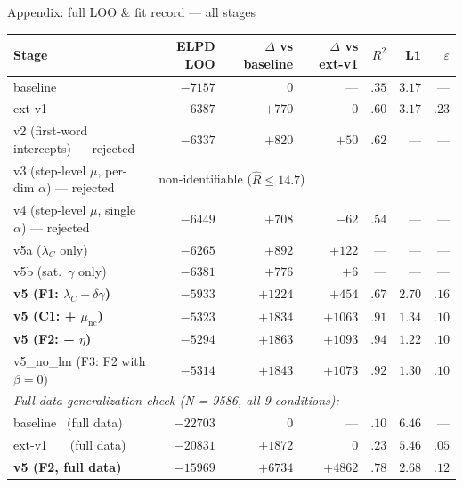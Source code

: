 \documentclass[10pt,aspectratio=169]{beamer}
\newcommand{\main}[1]{\textcolor{CSP-main-dark}{\textbf{#1}}}
\newcommand{\emp}[1]{\textcolor{CSP-emphasis}{\textbf{#1}}}
\newcommand{\acct}[1]{\textcolor{CSP-accent-1-dark}{#1}}      %
\newcommand{\muted}[1]{\textcolor{CSP-text-light}{#1}}
\begin{document}
\begin{frame}{Appendix: full LOO \& fit record --- all stages}
\footnotesize
\begin{center}
\begin{tabular}{l rrrr rr}
\toprule
Stage & ELPD LOO & $\Delta$ vs baseline & $\Delta$ vs ext-v1 & $R^2$ & L1 & $\varepsilon$ \\
\midrule
baseline        & $-7157$ & $0$       & ---       & $.35$ & $3.17$ & ---   \\
ext-v1          & $-6387$ & $+770$    & $0$       & $.60$ & $3.17$ & $.23$  \\
\muted{v2 (first-word intercepts) --- rejected}  & $-6337$ & $+820$  & $+50$   & $.62$ & ---     & ---   \\
\muted{v3 (step-level $\mu$, per-dim $\alpha$) --- rejected} & \multicolumn{6}{l}{non-identifiable ($\hat R \leq 14.7$)} \\
\muted{v4 (step-level $\mu$, single $\alpha$) --- rejected} & $-6449$ & $+708$  & $-62$   & $.54$ & ---     & ---   \\
\acct{v5a ($\lambda_C$ only)}         & $-6265$ & $+892$  & $+122$   & ---   & ---     & ---   \\
\acct{v5b (sat.\ $\gamma$ only)}      & $-6381$ & $+776$  & $+6$     & ---   & ---     & ---   \\
\main{v5 (F1: $\lambda_C + \delta\gamma$)}   & $-5933$ & $+1224$ & $+454$   & $.67$ & $2.70$  & $.16$ \\
\main{v5 (C1: + $\mu_\mathrm{nc}$)}          & $-5323$ & $+1834$ & $+1063$  & $.91$ & $1.34$  & $.10$ \\
\emp{v5 (F2: + $\eta$)}                      & $-5294$ & $+1863$ & $+1093$  & $.94$ & $1.22$  & $.10$ \\
\muted{v5\_no\_lm (F3: F2 with $\beta=0$)}     & $-5314$ & $+1843$ & $+1073$  & $.92$ & $1.30$  & $.10$ \\
\midrule
\multicolumn{7}{l}{\textit{Full data generalization check (N = 9586, all 9 conditions):}} \\
\muted{baseline \ (full data)}              & $-22703$ & $0$      & ---      & $.10$ & $6.46$  & ---   \\
\muted{ext-v1 \ \ \ (full data)}            & $-20831$ & $+1872$  & $0$      & $.23$ & $5.46$  & $.05$ \\
\main{v5 (F2, full data)}                   & $-15969$ & $+6734$  & $+4862$  & $.78$ & $2.68$  & $.12$ \\
\bottomrule
\end{tabular}
\end{center}


\end{frame}
\end{document}
